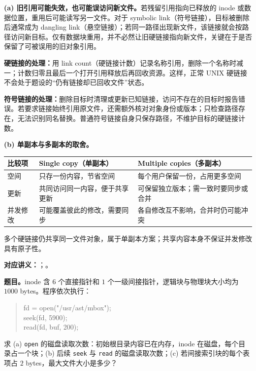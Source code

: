 \begin{checkedsolution}
\textbf{(a) 旧引用可能失效，也可能误访问新文件。}若残留引用指向已释放的 inode 或数据位置，重用后可能读写另一文件。对于 symbolic link（符号链接），目标被删除后通常成为 dangling link（悬空链接）；若同一路径出现新文件，该链接就会按路径访问新目标。仅有数据块重用，并不必然让旧硬链接指向新文件，关键在于是否保留了可被误用的旧对象引用。

\textbf{硬链接的处理：}用 link count（硬链接计数）记录名称引用，删除一个名称时减一；计数归零且最后一个打开引用释放后再回收资源。这样，正常 UNIX 硬链接不会处于题设的“仍有链接却已回收文件”状态。

\textbf{符号链接的处理：}删除目标时清理或更新已知链接，访问不存在的目标时报告错误。若要求链接始终引用原文件，还需额外核对对象身份或版本；只检查路径存在，无法识别同名替换。普通符号链接自身只保存路径，不维护目标的硬链接计数。

\begin{samepage}
\textbf{(b) 单副本与多副本的取舍。}
\begin{center}
\begin{tabularx}{\textwidth}{@{}l>{\raggedright\arraybackslash}X>{\raggedright\arraybackslash}X@{}}
\toprule
比较项 & Single copy（单副本） & Multiple copies（多副本） \\
\midrule
空间 & 只存一份内容，节省空间 & 每个用户保留一份，占用更多空间 \\
更新 & 共同访问同一内容，便于共享更新 & 可保留独立版本；需一致时要同步或合并 \\
并发修改 & 可能覆盖彼此的修改，需要同步 & 各自修改互不影响，合并时仍可能冲突 \\
\bottomrule
\end{tabularx}
\end{center}
\end{samepage}
多个硬链接仍共享同一文件对象，属于单副本方案；共享内容本身不保证并发修改具有原子性。
\end{checkedsolution}


\textbf{对应讲义：}；。

\textbf{题目。}inode 含 $6$ 个直接指针和 $1$ 个一级间接指针，逻辑块与物理块大小均为 $1000$ bytes。程序依次执行：
\begin{quote}\ttfamily
fd = open("/usr/ast/mbox");\\
seek(fd, 5900);\\
read(fd, buf, 200);
\end{quote}
求 (a) \texttt{open} 的磁盘读取次数：初始根目录内容已在内存，inode 在磁盘，每个目录占一个块；(b) 后续 \texttt{seek} 与 \texttt{read} 的磁盘读取次数；(c) 若间接索引块的每个表项占 $2$ bytes，最大文件大小是多少？

